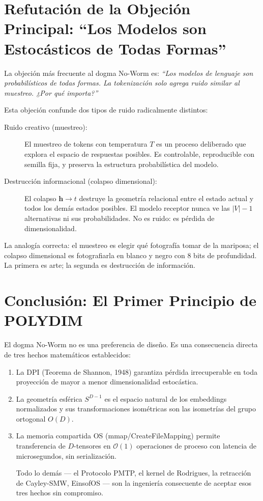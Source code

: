 \section{Refutación de la Objeción Principal: ``Los Modelos son Estocásticos de Todas Formas''}

La objeción más frecuente al dogma No-Worm es: \textit{``Los modelos de lenguaje
son probabilísticos de todas formas. La tokenización solo agrega ruido similar
al muestreo. ¿Por qué importa?''}

Esta objeción confunde dos tipos de ruido radicalmente distintos:

\begin{description}
\item[Ruido creativo (muestreo):] El muestreo de tokens con temperatura $T$ es
un proceso deliberado que explora el espacio de respuestas posibles. Es controlable,
reproducible con semilla fija, y preserva la estructura probabilística del modelo.

\item[Destrucción informacional (colapso dimensional):] El colapso $\mathbf{h} \to t$
destruye la geometría relacional entre el estado actual y todos los demás estados
posibles. El modelo receptor nunca ve las $|V|-1$ alternativas ni sus probabilidades.
No es ruido: es pérdida de dimensionalidad.
\end{description}

La analogía correcta: el muestreo es elegir qué fotografía tomar de la mariposa;
el colapso dimensional es fotografiarla en blanco y negro con 8 bits de profundidad.
La primera es arte; la segunda es destrucción de información.

\section{Conclusión: El Primer Principio de POLYDIM}

El dogma No-Worm no es una preferencia de diseño. Es una consecuencia directa
de tres hechos matemáticos establecidos:

\begin{enumerate}
\item La DPI (Teorema de Shannon, 1948) garantiza pérdida irrecuperable en toda
proyección de mayor a menor dimensionalidad estocástica.

\item La geometría esférica $S^{D-1}$ es el espacio natural de los embeddings
normalizados y sus transformaciones isométricas son las isometrías del grupo
ortogonal $O(D)$.

\item La memoria compartida OS (mmap/CreateFileMapping) permite transferencia
de $D$-tensores en $\mathcal{O}(1)$ operaciones de proceso con latencia de
microsegundos, sin serialización.

Todo lo demás --- el Protocolo PMTP, el kernel de Rodrigues, la retracción
de Cayley-SMW, EinsofOS --- son la ingeniería consecuente de aceptar esos
tres hechos sin compromiso.
\end{enumerate}
